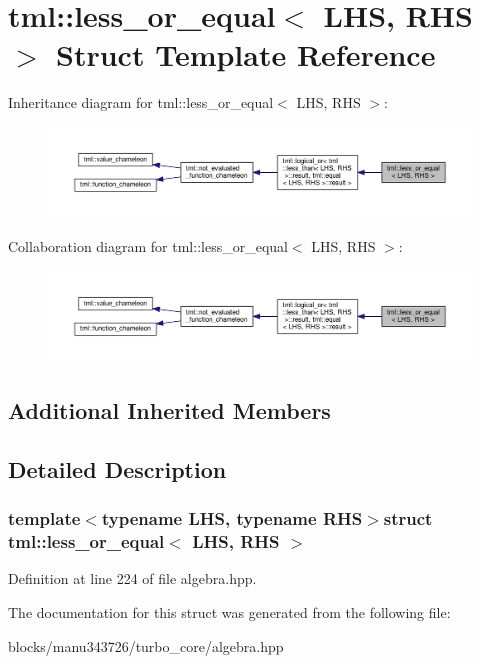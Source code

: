 \hypertarget{structtml_1_1less__or__equal}{\section{tml\+:\+:less\+\_\+or\+\_\+equal$<$ L\+H\+S, R\+H\+S $>$ Struct Template Reference}
\label{structtml_1_1less__or__equal}
}


Inheritance diagram for tml\+:\+:less\+\_\+or\+\_\+equal$<$ L\+H\+S, R\+H\+S $>$\+:
\nopagebreak
\begin{figure}[H]
\begin{center}
\leavevmode
\includegraphics[width=350pt]{structtml_1_1less__or__equal__inherit__graph}
\end{center}
\end{figure}


Collaboration diagram for tml\+:\+:less\+\_\+or\+\_\+equal$<$ L\+H\+S, R\+H\+S $>$\+:
\nopagebreak
\begin{figure}[H]
\begin{center}
\leavevmode
\includegraphics[width=350pt]{structtml_1_1less__or__equal__coll__graph}
\end{center}
\end{figure}
\subsection*{Additional Inherited Members}


\subsection{Detailed Description}
\subsubsection*{template$<$typename L\+H\+S, typename R\+H\+S$>$struct tml\+::less\+\_\+or\+\_\+equal$<$ L\+H\+S, R\+H\+S $>$}



Definition at line 224 of file algebra.\+hpp.



The documentation for this struct was generated from the following file\+:\begin{DoxyCompactItemize}
\item 
blocks/manu343726/turbo\+\_\+core/algebra.\+hpp\end{DoxyCompactItemize}
